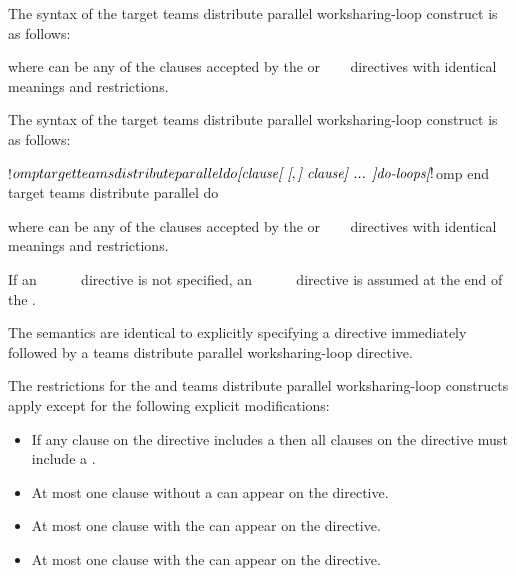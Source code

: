 \syntax
\begin{ccppspecific}
The syntax of the target teams distribute parallel worksharing-loop construct is as follows:

\begin{ompcPragma}[fontsize=\small]
#pragma omp target teams distribute parallel for \plc{\}
            \plc{[clause[ [},\plc{] clause] ... ] new-line}
    \plc{for-loops}
\end{ompcPragma}

where  can be any of the clauses accepted by the  or
~~~ directives with identical
meanings and restrictions.
\end{ccppspecific}

\begin{fortranspecific}
The syntax of the target teams distribute parallel worksharing-loop construct is as follows:

\begin{ompfPragma}
!$omp target teams distribute parallel do \plc{[clause[ [},\plc{] clause] ... ]}
    \plc{do-loops}
\plc{[}!$omp end target teams distribute parallel do\plc{]}
\end{ompfPragma}

where  can be any of the clauses accepted by the  or
~~~ directives with
identical meanings and restrictions.

If an ~~~~~ directive is not specified, an
~~~~~
directive is assumed at the end of the .
\end{fortranspecific}

\descr
The semantics are identical to explicitly specifying a 
directive immediately followed by a teams distribute parallel worksharing-loop directive.


\restrictions
The restrictions for the  and teams distribute parallel
worksharing-loop constructs apply except for the following explicit modifications:

\begin{itemize}
\item If any  clause on the directive includes a
       then all  clauses
      on the directive must include a .

\item At most one  clause without a
       can appear on the directive.

\item At most one  clause with the 
       can appear on the directive.


\item At most one  clause with the 
       can appear on the directive.
\end{itemize}

